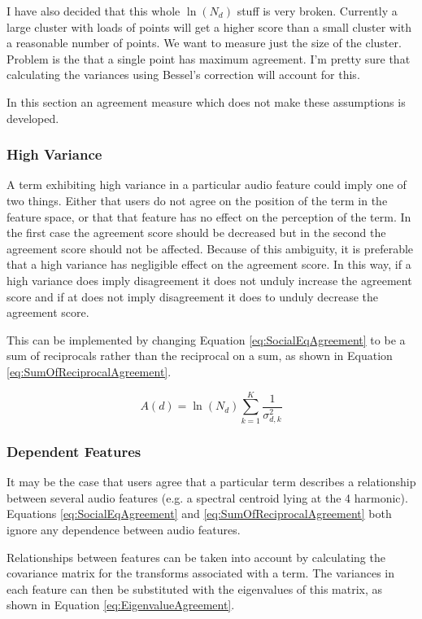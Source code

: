 		\note
		{
			I have also decided that this whole $\ln(N_{d})$ stuff is very broken. Currently a large cluster
			with loads of points will get a higher score than a small cluster with a reasonable number of
			points. We want to measure just the size of the cluster. Problem is the that a single point has
			maximum agreement. I'm pretty sure that calculating the variances using Bessel's correction will
			account for this.
		}

		In this section an agreement measure which does not make these assumptions is developed.

		\subsubsection*{High Variance}
			A term exhibiting high variance in a particular audio feature could imply one of two things. Either
			that users do not agree on the position of the term in the feature space, or that that feature has
			no effect on the perception of the term. In the first case the agreement score should be decreased
			but in the second the agreement score should not be affected. Because of this ambiguity, it is
			preferable that a high variance has negligible effect on the agreement score. In this way, if a
			high variance does imply disagreement it does not unduly increase the agreement score and if at
			does not imply disagreement it does to unduly decrease the agreement score.
			
			This can be implemented by changing Equation \ref{eq:SocialEqAgreement} to be a sum of reciprocals
			rather than the reciprocal on a sum, as shown in Equation \ref{eq:SumOfReciprocalAgreement}.

			\begin{equation}
				A(d) = \ln(N_{d}) \sum_{k = 1}^{K} \frac{1}{\sigma_{d,k}^{2}}
				\label{eq:SumOfReciprocalAgreement}
			\end{equation}

		\subsubsection*{Dependent Features}
			It may be the case that users agree that a particular term describes a relationship between several
			audio features (e.g.  a spectral centroid lying at the 4 harmonic). Equations
			\ref{eq:SocialEqAgreement} and \ref{eq:SumOfReciprocalAgreement} both ignore any dependence between
			audio features.

			Relationships between features can be taken into account by calculating the covariance matrix for
			the transforms associated with a term. The variances in each feature can then be substituted with
			the eigenvalues of this matrix, as shown in Equation \ref{eq:EigenvalueAgreement}.

